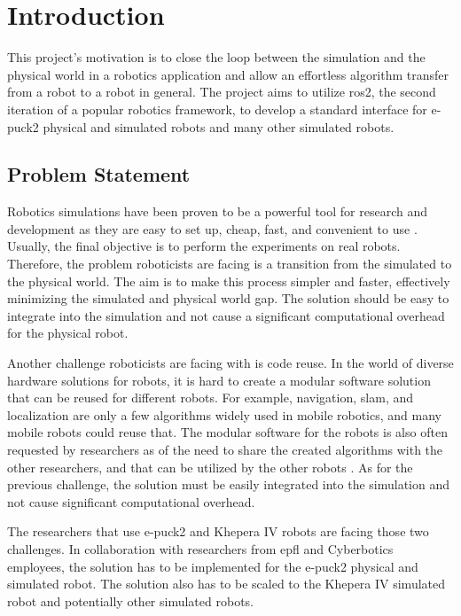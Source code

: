 \chapter{Introduction}
\label{chap:introduction}

This project's motivation is to close the loop between the simulation and the physical world in a robotics application and allow an effortless algorithm transfer from a robot to a robot in general.
The project aims to utilize \ac{ros2}, the second iteration of a popular robotics framework, to develop a standard interface for e-puck2 physical and simulated robots and many other simulated robots.

\section{Problem Statement}
Robotics simulations have been proven to be a powerful tool for research and development as they are easy to set up, cheap, fast, and convenient to use \cite{michel_cyberbotics_2004}.
Usually, the final objective is to perform the experiments on real robots.
Therefore, the problem roboticists are facing is a transition from the simulated to the physical world.
The aim is to make this process simpler and faster, effectively minimizing the simulated and physical world gap. 
The solution should be easy to integrate into the simulation and not cause a significant computational overhead for the physical robot.

Another challenge roboticists are facing with is code reuse. 
In the world of diverse hardware solutions for robots, it is hard to create a modular software solution that can be reused for different robots.
For example, navigation, \ac{slam}, and localization are only a few algorithms widely used in mobile robotics, and many mobile robots could reuse that.
The modular software for the robots is also often requested by researchers as of the need to share the created algorithms with the other researchers, and that can be utilized by the other robots \cite{vaughan_really_2007}.
As for the previous challenge, the solution must be easily integrated into the simulation and not cause significant computational overhead.

The researchers that use e-puck2 and Khepera IV robots are facing those two challenges.
In collaboration with researchers from \ac{epfl} and Cyberbotics employees, the solution has to be implemented for the e-puck2 physical and simulated robot.
The solution also has to be scaled to the Khepera IV simulated robot and potentially other simulated robots.

